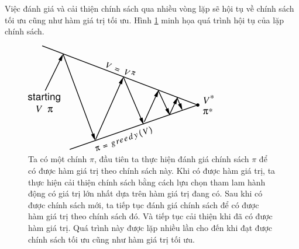 Việc đánh giá và cải thiện chính sách qua nhiều vòng lặp sẽ hội tụ về chính sách tối ưu cũng như hàm giá trị tối ưu. Hình \ref{fig:policy_iteration_MDP} minh họa quá trình hội tụ của lặp chính sách.
\begin{figure}
	\centering
	\includegraphics[width=\textwidth]{policy_iteration}
	\caption[Hội tụ của quy trình tìm kiếm chính sách tối ưu]{Ta có một chính $\pi$, đầu tiên ta thực hiện đánh giá chính sách $\pi$ để có được hàm giá trị theo chính sách này. Khi có được hàm giá trị, ta thực hiện cải thiện chính sách bằng cách lựu chọn tham lam hành động có giá trị lớn nhất dựa trên hàm giá trị đang có. Sau khi có được chính sách mới, ta tiếp tục đánh giá chính sách để có được hàm giá trị theo chính sách đó. Và tiếp tục cải thiện khi đã có được hàm giá trị. Quá trình này được lặp nhiều lần cho đến khi đạt được chính sách tối ưu cũng như hàm giá trị tối ưu.}
	\label{fig:policy_iteration_MDP}	
\end{figure}

